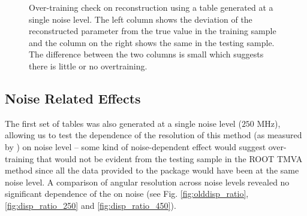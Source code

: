 \documentclass[main.tex]{subfiles}
\begin{document}
\begin{figure}[H]
{    \label{fig:dispErr_test_overtraining}
  }
  \caption[Over-training test.]{Over-training check on reconstruction using a \disp table generated at a single noise level. The left column shows the deviation of the reconstructed parameter from the true value in the training sample and the column on the right shows the same in the testing sample. The difference between the two columns is small which suggests there is little or no overtraining.}
  \label{fig:overtraining}
\end{figure}

\subsection{Noise Related Effects}
The first set of \disp tables was also generated at a single noise level ($250$ MHz), allowing us to test the dependence of the resolution of this method (as measured by \rse) on noise level -- some kind of noise-dependent effect would suggest over-training that would not be evident from the testing sample in the ROOT TMVA method since all the data provided to the package would have been at the same noise level. A comparison of angular resolution across noise levels revealed no significant dependence of the \rse on noise (see Fig. \ref{fig:olddisp_ratio}, \ref{fig:disp_ratio_250} and \ref{fig:disp_ratio_450}).
\end{document}
